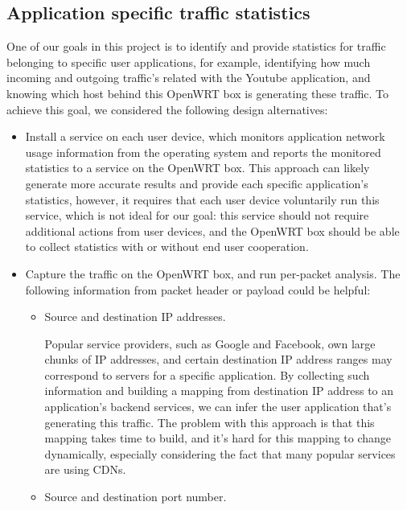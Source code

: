 \subsection{Application specific traffic statistics}
\label{sec:app-specific-design}

One of our goals in this project is to identify and provide statistics for traffic belonging to specific user applications, for example, identifying how much incoming and outgoing traffic's related with the Youtube application, and knowing which host behind this OpenWRT box is generating these traffic. To achieve this goal, we considered the following design alternatives:

\begin{itemize}

\item Install a service on each user device, which monitors application network usage information from the operating system and reports the monitored statistics to a service on the OpenWRT box. This approach can likely generate more accurate results and provide each specific application's statistics, however, it requires that each user device voluntarily run this service, which is not ideal for our goal: this service should not require additional actions from user devices, and the OpenWRT box should be able to collect statistics with or without end user cooperation.

\item Capture the traffic on the OpenWRT box, and run per-packet analysis. The following information from packet header or payload could be helpful:

  \begin{itemize}

  \item Source and destination IP addresses. 

  Popular service providers, such as Google and Facebook, own large chunks of IP addresses, and certain destination IP address ranges may correspond to servers for a specific application. By collecting such information and building a  mapping from destination IP address to an application's backend services, we can infer the user application that's generating this traffic. The problem with this approach is that this mapping takes time to build, and it's hard for this mapping to change dynamically, especially considering the fact that many popular services are using CDNs.

  \item Source and destination port number. 


\end{itemize}
\end{itemize}
